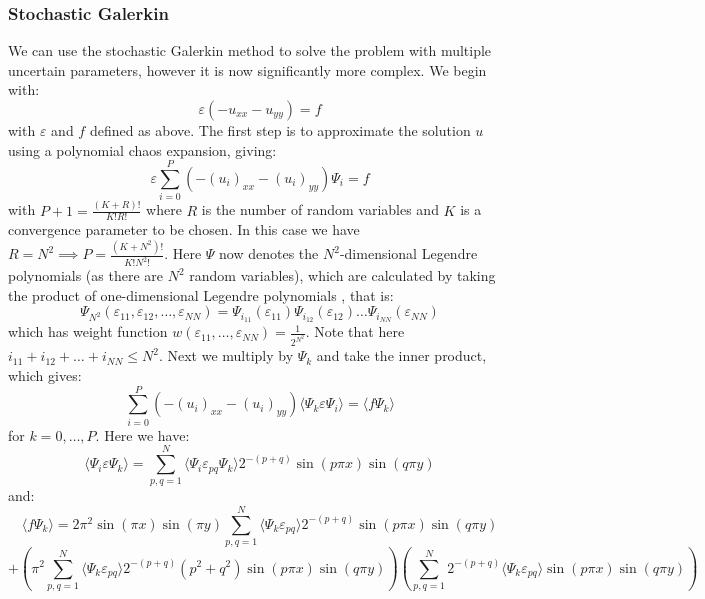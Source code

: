 \documentclass[11pt]{article}
\numberwithin{equation}{section}
\begin{document}
\subsubsection{Stochastic Galerkin}
We can use the stochastic Galerkin method to solve the problem with multiple uncertain parameters, however it is now significantly more complex. We begin with:
\begin{equation}
\varepsilon(-u_{xx} - u_{yy}) = f
\end{equation}
with $\varepsilon$ and $f$ defined as above. The first step is to approximate the solution $u$ using a polynomial chaos expansion, giving:
\begin{equation}
\varepsilon \sum_{i=0}^P (-(u_i)_{xx} - (u_i)_{yy}) \Psi_i = f
\end{equation}
with $P+1 = \frac{(K+R)!}{K!R!}$ where $R$ is the number of random variables and $K$ is a convergence parameter to be chosen. In this case we have $R = N^2 \implies P=\frac{(K+N^2)!}{K!N^2!}$. Here $\Psi$ now denotes the $N^2$-dimensional Legendre polynomials (as there are $N^2$ random variables), which are calculated by taking the product of one-dimensional Legendre polynomials \cite{Paul}, that is:
\begin{equation}
\Psi_{N^2} (\varepsilon_{11}, \varepsilon_{12}, \dots, \varepsilon_{NN}) = \Psi_{i_{11}} (\varepsilon_{11})  \Psi_{i_{12}} (\varepsilon_{12}) \dots \Psi_{i_{NN}} (\varepsilon_{NN})  
\end{equation}
which has weight function $w(\varepsilon_{11}, \dots, \varepsilon_{NN}) = \frac{1}{2^{N^2}}$. Note that here $i_{11} + i_{12} + \dots + i_{NN} \leq N^2$. Next we multiply by $\Psi_k$ and take the inner product, which gives:
\begin{equation}
\sum_{i=0}^P (-(u_i)_{xx} - (u_i)_{yy}) \langle \Psi_k \varepsilon \Psi_i \rangle = \langle f \Psi_k \rangle
\end{equation}
for $k=0,\dots,P$. Here we have:
\begin{equation}
\langle \Psi_i \varepsilon \Psi_k \rangle = \sum_{p,q=1}^N \langle \Psi_i \varepsilon_{pq} \Psi_k \rangle 2^{-(p+q)} \sin(p\pi x)\sin(q\pi y) 
\end{equation}
and:
\begin{equation}
\langle f \Psi_k \rangle = 2 \pi^2 \sin(\pi x)\sin(\pi y) \sum_{p,q=1}^N \langle \Psi_k \varepsilon_{pq} \rangle 2^{-(p+q)} \sin(p \pi x) \sin(q \pi y)  \nonumber
\end{equation}
\begin{equation}
+ \left(\pi^2 \sum_{p,q=1}^N \langle \Psi_k \varepsilon_{pq} \rangle 2^{-(p+q)} (p^2 + q^2) \sin(p \pi x)\sin(q \pi y) \right) \left(\sum_{p,q=1}^N 2^{-(p+q)} \langle \Psi_k \varepsilon_{pq} \rangle \sin(p \pi x)\sin(q \pi y) \right)
\end{equation}
\end{document}

